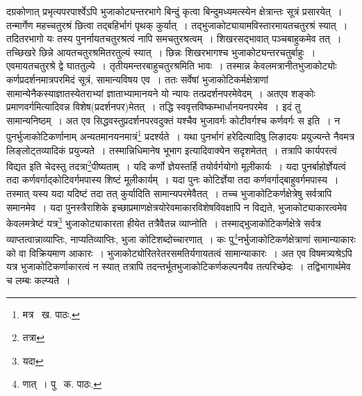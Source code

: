 \documentclass[11pt, openany]{book}
\begin{document}
\noindent दग्रकोणात् प्रभृत्यपरपार्श्वेऽपि भुजाकोट्यन्तरभागे बिन्दुं कृत्वा बिन्दुमध्यमत्स्येन क्षेत्रान्तः सूत्रं प्रसारयेत्~। तन्मार्गेण महच्चतुरश्रं
छित्वा तद्बहिर्भागं पृथक् कुर्यात्~। तद्भुजाकोट्यायामविस्तारमायतचतुरश्रं स्यात्~। तदितरभागो यः तस्य पुनर्नायतचतुरश्रत्वं नापि समचतुरश्रत्वम्~। शिखरसद्भावात् पञ्चबाहुकमेव तत्~। तच्छिखरे छिन्ने आयतचतुरश्रमितरतुल्यं स्यात्~। छिन्नः शिखरभागश्च भुजाकोट्यन्तरचतुर्बाहुः~। एवमायतचतुरश्रे द्वे घाततुल्ये~। तृतीयमन्तरबाहुचतुरश्रमिति भावः~। तस्मान्न केवलमत्रानीतभुजाकोट्योः कर्णप्रदर्शनमात्रपरमिदं सूत्रं, सामान्यविषय एव~। ततः सर्वेषां
भुजाकोटिकर्मक्षेत्राणां सामान्येनैकस्याज्ञातस्येतराभ्यां ज्ञाताभ्यामानयने यो न्यायः तत्प्रदर्शनपरमेवेदम्~। अतएव शङ्कोः प्रमाणवर्गमित्यादिवन्न विशेष(प्रदर्शनपर)मेतत्~। तद्धि स्ववृत्तविष्कम्भार्धानयनपरमेव~। इदं तु सामान्यनिष्ठम्~। अत एव सिद्धवस्तुप्रदर्शनपरवदुक्तं {\qt यश्चैव भुजावर्गः कोटीवर्गश्च कर्णवर्गः स} इति~। न पुनर्भुजाकोटिकर्णानाम् अन्यतमानयनमात्रं\renewcommand{\thefootnote}{१}\footnote{मत्र \textendash\ ख. पाठः.} प्रदर्श्यते~। यथा पुनर्भागं हरेदित्यादिषु लिङादयः प्रयुज्यन्ते नैवमत्र लिङ्लोट्तव्यादिकं प्रयुज्यते~। तस्मान्निधिमानेष भूभाग इत्यादिवाक्येन सदृशमेतत्~। तत्रापि कार्यपरत्वं विद्यत इति चेदस्तु तदत्रा\renewcommand{\thefootnote}{२}\footnote{तत्रा}पीष्यताम्~। यदि कर्णो ज्ञेयस्तर्हि तयोर्वर्गयोगो मूलीकार्यः~। यदा पुनर्बाहोर्ज्ञेयत्वं तदा कर्णवर्गाद्कोटिवर्गमपास्य शिष्टं मूलीकार्यम्~। यदा पुनः कोटिर्ज्ञेया तदा कर्णवर्गाद्बाहुवर्गमपास्य~। तस्मात् यस्य यदा यदिष्टं तदा तत् कुर्यादिति सामान्यपरमेवैतत्~। तच्च भुजाकोटिकर्णक्षेत्रेषु सर्वत्रापि समानमेव~। यदा पुनस्त्रैराशिके इच्छाप्रमाणक्षेत्रयोरेवमाकारविशेषविवक्षापि न विद्यते, भुजाकोट्याकारत्वमेव केवलमत्रेष्टं यत्र\renewcommand{\thefootnote}{३}\footnote{यदा} भुजाकोट्याकारता हीयेत तत्रैवैतन्न व्याप्नोति~। तस्माद्भुजाकोटिकर्णक्षेत्रे सर्वत्र व्याप्तत्वान्नाव्याप्तिः, नाप्यतिव्याप्तिः, भुजा कोटिशब्दोच्चारणात्~। कः पु\renewcommand{\thefootnote}{४}\footnote{णात्~। पु \textendash\ क. पाठः.}नर्भुजाकोटिकर्णक्षेत्राणां सामान्याकारः को वा विक्रियमाण आकारः~। भुजाकोट्योरितरेतरसमतिर्यगायतत्वं सामान्याकारः~। अत एव विषमत्र्यश्रेऽपि यत्र भुजाकोटिकर्णाकारत्वं न स्यात् तत्रापि तदन्तर्भूतभुजाकोटिकर्णकल्पनयैव तत्परिच्छेदः~। तद्विभागार्थमेव च लम्बः कल्प्यते~।

\newpage
\end{document}

